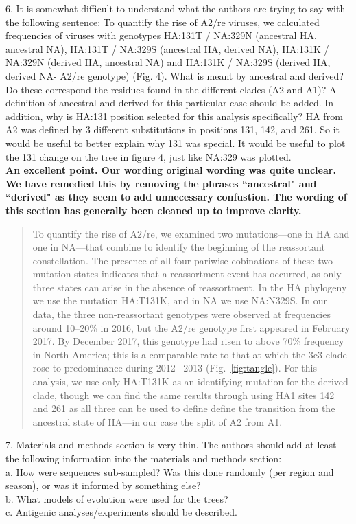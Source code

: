 \documentclass[11pt,oneside,letterpaper]{article}
\begin{document}
6. It is somewhat difficult to understand what the authors are trying to say with the following sentence: To quantify the rise of A2/re viruses, we calculated frequencies of viruses with genotypes HA:131T / NA:329N (ancestral HA, ancestral NA), HA:131T / NA:329S (ancestral HA, derived NA), HA:131K / NA:329N (derived HA, ancestral NA) and HA:131K / NA:329S (derived HA, derived NA- A2/re genotype) (Fig. 4). What is meant by ancestral and derived? Do these correspond the residues found in the different clades (A2 and A1)? A definition of ancestral and derived for this particular case should be added. In addition, why is HA:131 position selected for this analysis specifically? HA from A2 was defined by 3 different substitutions in positions 131, 142, and 261. So it would be useful to better explain why 131 was special. It would be useful to plot the 131 change on the tree in figure 4, just like NA:329 was plotted.\\

\textbf{An excellent point. Our wording original wording was quite unclear. We have remedied this by removing the phrases ``ancestral" and ``derived" as they seem to add unnecessary confustion. The wording of this section has generally been cleaned up to improve clarity.}

\begin{quotation}
  To quantify the rise of A2/re, we examined two mutations---one in HA and one in NA---that combine to identify the beginning of the reassortant constellation.
  The presence of all four pariwise cobinations of these two mutation states indicates that a reassortment event has occurred, as only three states can arise in the absence of reassortment.
  In the HA phylogeny we use the mutation HA:T131K, and in NA we use NA:N329S.
  In our data, the three non-reassortant genotypes were observed at frequencies around 10--20\% in 2016, but the A2/re genotype first appeared in February 2017.
  By December 2017, this genotype had risen to above 70\% frequency in North America; this is a comparable rate to that at which the 3c3 clade rose to predominance during 2012–-2013 (Fig.~\ref{fig:tangle}).
  For this analysis, we use only HA:T131K as an identifying mutation for the derived clade, though we can find the same results through using HA1 sites 142 and 261 as all three can be used to define define the transition from the ancestral state of HA---in our case the split of A2 from A1.
\end{quotation}

7. Materials and methods section is very thin. The authors should add at least the following information into the materials and methods section: \\
a.      How were sequences sub-sampled? Was this done randomly (per region and season), or was it informed by something else?\\
b.      What models of evolution were used for the trees?\\
c.      Antigenic analyses/experiments should be described.\\
\end{document}
